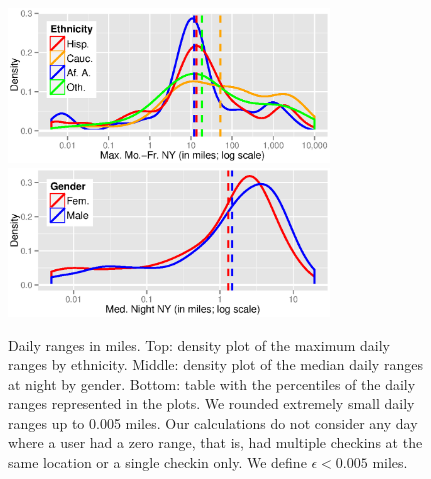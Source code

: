 \begin{figure}[t]
	\centering
    \includegraphics[width=3.35in]{fig/footprints/max_ranges_eth_ny.eps}
    \includegraphics[width=3.35in]{fig/footprints/med_ranges_gender_ny.eps}
	\vspace{0.1ex}

{\small
{}}
	\caption{Daily ranges in miles. Top: density plot of the maximum daily ranges by ethnicity. Middle: density plot of the median daily ranges at night by gender. Bottom: table with the percentiles of the daily ranges represented in the plots. We rounded extremely small daily ranges up to 0.005 miles. Our calculations do not consider any day where a user had a zero range, that is, had multiple checkins at the same location or a single checkin only. We define $\epsilon<0.005$ miles.}
	\label{fig:ranges_ny}
\end{figure}

